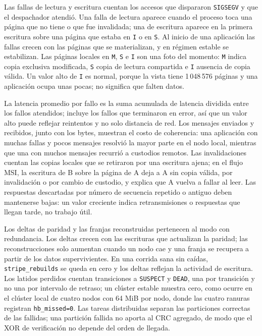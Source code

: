 Las fallas de lectura y escritura cuentan los accesos que dispararon \texttt{SIGSEGV} y que el despachador atendió. Una falla de lectura aparece cuando el proceso toca una página que no tiene o que fue invalidada; una de escritura aparece en la primera escritura sobre una página que estaba en \texttt{I} o en \texttt{S}. Al inicio de una aplicación las fallas crecen con las páginas que se materializan, y en régimen estable se estabilizan. Las páginas locales en \texttt{M}, \texttt{S} e \texttt{I} son una foto del momento: \texttt{M} indica copia exclusiva modificada, \texttt{S} copia de lectura compartida e \texttt{I} ausencia de copia válida. Un valor alto de \texttt{I} es normal, porque la vista tiene 1\,048\,576 páginas y una aplicación ocupa unas pocas; no significa que falten datos.

La latencia promedio por fallo es la suma acumulada de latencia dividida entre los fallos atendidos; incluye los fallos que terminaron en error, así que un valor alto puede reflejar reintentos y no solo distancia de red. Los mensajes enviados y recibidos, junto con los bytes, muestran el costo de coherencia: una aplicación con muchas fallas y pocos mensajes resolvió la mayor parte en el nodo local, mientras que una con muchos mensajes recurrió a custodios remotos. Las invalidaciones cuentan las copias locales que se retiraron por una escritura ajena; en el flujo MSI, la escritura de B sobre la página de A deja a A sin copia válida, por invalidación o por cambio de custodio, y explica que A vuelva a fallar al leer. Las respuestas descartadas por número de secuencia repetido o antiguo deben mantenerse bajas: un valor creciente indica retransmisiones o respuestas que llegan tarde, no trabajo útil.

Los deltas de paridad y las franjas reconstruidas pertenecen al modo con redundancia. Los deltas crecen con las escrituras que actualizan la paridad; las reconstrucciones solo aumentan cuando un nodo cae y una franja se recupera a partir de los datos supervivientes. En una corrida sana sin caídas, \texttt{stripe\_rebuilds} se queda en cero y los deltas reflejan la actividad de escritura. Los latidos perdidos cuentan transiciones a \texttt{SUSPECT} y \texttt{DEAD}, una por transición y no una por intervalo de retraso; un clúster estable muestra cero, como ocurre en el clúster local de cuatro nodos con 64 MiB por nodo, donde las cuatro ranuras registran \texttt{hb\_missed=0}. Las tareas distribuidas separan las particiones correctas de las fallidas; una partición fallida no aporta al CRC agregado, de modo que el XOR de verificación no depende del orden de llegada.


